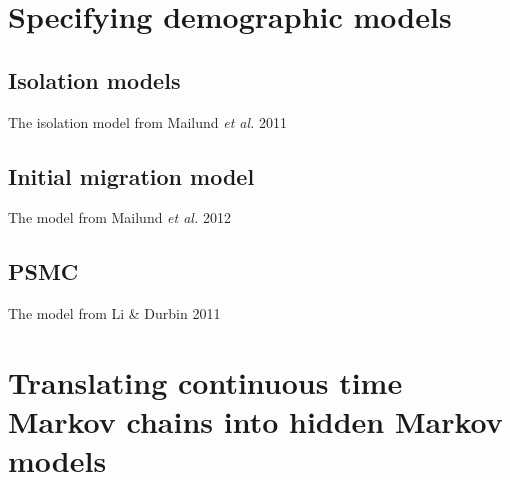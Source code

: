 \documentclass[11pt]{article}
\begin{document}
\section{Specifying demographic models}

\subsection{Isolation models}

The isolation model from Mailund \emph{et al.} 2011 \cite{Mailund:2011dv}

\subsection{Initial migration model}

The model from Mailund \emph{et al.} 2012 \cite{Mailund:2012ew}

\subsection{PSMC}

The model from Li \& Durbin 2011 \cite{Li:2011ez}


\section{Translating continuous time Markov chains into hidden Markov models}






\end{document}

